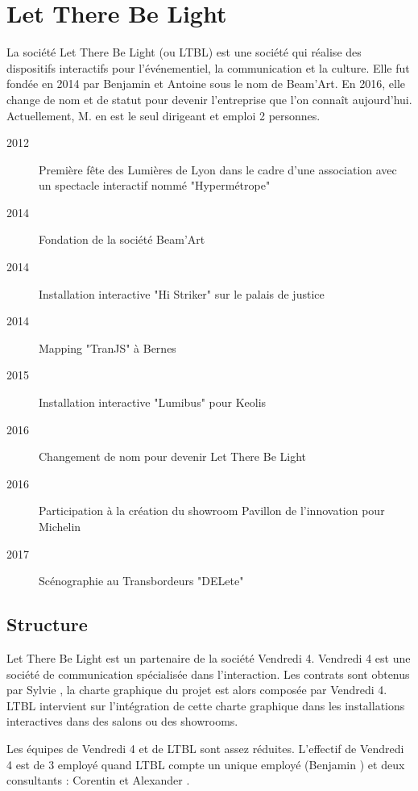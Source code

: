 \section{Let There Be Light}

La société Let There Be Light (ou LTBL) est une société qui réalise des dispositifs interactifs pour l'événementiel, la communication et la culture.
Elle fut fondée en 2014 par Benjamin  et Antoine  sous le nom de Beam'Art.
En 2016, elle change de nom et de statut pour devenir l'entreprise que l'on connaît aujourd'hui.
Actuellement, M.  en est le seul dirigeant et emploi 2 personnes.

\begin{description}
    \item[2012] Première fête des Lumières de Lyon dans le cadre d'une association avec un spectacle interactif nommé "Hypermétrope"
    \item[2014] Fondation de la société Beam'Art
    \item[2014] Installation interactive "Hi Striker" sur le palais de justice
    \item[2014] Mapping "TranJS" à Bernes
    \item[2015] Installation interactive "Lumibus" pour Keolis
    \item[2016] Changement de nom pour devenir Let There Be Light
    \item[2016] Participation à la création du showroom Pavillon de l'innovation pour Michelin
    \item[2017] Scénographie au Transbordeurs "DELete"
\end{description}

\subsection{Structure}

Let There Be Light est un partenaire de la société Vendredi 4.
Vendredi 4 est une société de communication spécialisée dans l'interaction.
Les contrats sont obtenus par Sylvie , la charte graphique du projet est alors composée par Vendredi 4.
LTBL intervient sur l'intégration de cette charte graphique dans les installations interactives dans des salons ou des showrooms.

Les équipes de Vendredi 4 et de LTBL sont assez réduites.
L'effectif de Vendredi 4 est de 3 employé quand LTBL compte un unique employé (Benjamin ) et deux consultants : Corentin  et Alexander .

